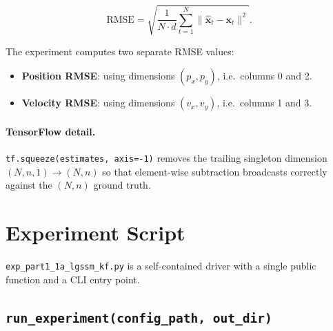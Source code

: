 \documentclass[11pt,a4paper]{article}
\newcommand{\py}[1]{\lstinline[style=py]{#1}}
\newcommand{\file}[1]{\texttt{#1}}
\begin{document}
\begin{equation}
  \text{RMSE} = \sqrt{\frac{1}{N \cdot d}\sum_{t=1}^{N}
    \|\hat{\bm{x}}_t - \bm{x}_t\|^2}.
  \label{eq:rmse}
\end{equation}

The experiment computes two separate RMSE values:
\begin{itemize}
\item \textbf{Position RMSE}: using dimensions $(p_x, p_y)$,
      i.e.\ columns 0 and 2.
\item \textbf{Velocity RMSE}: using dimensions $(v_x, v_y)$,
      i.e.\ columns 1 and 3.
\end{itemize}

\paragraph{TensorFlow detail.}
\py{tf.squeeze(estimates, axis=-1)} removes the trailing
singleton dimension $(N, n, 1) \to (N, n)$ so that element-wise
subtraction broadcasts correctly against the $(N, n)$ ground truth.


\section{Experiment Script}
\label{sec:experiment}

\file{exp\_part1\_1a\_lgssm\_kf.py} is a self-contained driver with
a single public function and a CLI entry point.

\subsection{\py{run_experiment(config_path, out_dir)}}
\end{document}
